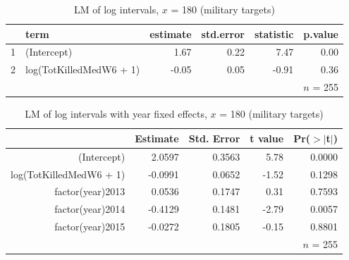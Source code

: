 \documentclass[letterpaper,12pt]{article}
\theoremstyle{definition}
\begin{document}
\begin{table}[h!]
\centering
\caption {LM of log intervals, $x$ = 180 (military targets)}
\begin{tabular}{rlrrrr}
  \hline
 & term & estimate & std.error & statistic & p.value \\ 
  \hline
1 & (Intercept) & 1.67 & 0.22 & 7.47 & 0.00 \\ 
  2 & log(TotKilledMedW6 + 1) & -0.05 & 0.05 & -0.91 & 0.36 \\ 
   \hline
&&&&&$n$ = 255
\end{tabular}
\end{table}

\begin{table}[h!]
\centering
\caption {LM of log intervals with year fixed effects, $x$ = 180 (military targets)}
\begin{tabular}{rrrrr}
  \hline
 & Estimate & Std. Error & t value & Pr($>$$|$t$|$) \\ 
  \hline
(Intercept) & 2.0597 & 0.3563 & 5.78 & 0.0000 \\ 
  log(TotKilledMedW6 + 1) & -0.0991 & 0.0652 & -1.52 & 0.1298 \\ 
  factor(year)2013 & 0.0536 & 0.1747 & 0.31 & 0.7593 \\ 
  factor(year)2014 & -0.4129 & 0.1481 & -2.79 & 0.0057 \\ 
  factor(year)2015 & -0.0272 & 0.1805 & -0.15 & 0.8801 \\ 
   \hline
&&&&$n$ = 255
\end{tabular}
\end{table}
\end{document}

